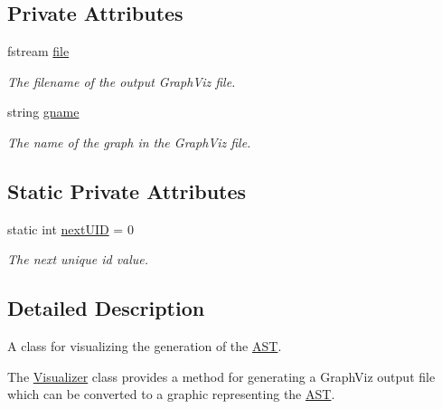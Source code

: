 \subsection*{Private Attributes}
\begin{DoxyCompactItemize}
\item 
\hypertarget{classVisualizer_a19e773638cb9f4665a9bdb44348f584c}{fstream \hyperlink{classVisualizer_a19e773638cb9f4665a9bdb44348f584c}{file}}\label{classVisualizer_a19e773638cb9f4665a9bdb44348f584c}

\begin{DoxyCompactList}\small\item\em The filename of the output Graph\-Viz file. \end{DoxyCompactList}\item 
\hypertarget{classVisualizer_a931ff38910382c55271e07617aac0422}{string \hyperlink{classVisualizer_a931ff38910382c55271e07617aac0422}{gname}}\label{classVisualizer_a931ff38910382c55271e07617aac0422}

\begin{DoxyCompactList}\small\item\em The name of the graph in the Graph\-Viz file. \end{DoxyCompactList}\end{DoxyCompactItemize}
\subsection*{Static Private Attributes}
\begin{DoxyCompactItemize}
\item 
\hypertarget{classVisualizer_adee8de8f3890a06ae60f88b85ac98bc1}{static int \hyperlink{classVisualizer_adee8de8f3890a06ae60f88b85ac98bc1}{next\-U\-I\-D} = 0}\label{classVisualizer_adee8de8f3890a06ae60f88b85ac98bc1}

\begin{DoxyCompactList}\small\item\em The next unique id value. \end{DoxyCompactList}\end{DoxyCompactItemize}


\subsection{Detailed Description}
A class for visualizing the generation of the \hyperlink{classAST}{A\-S\-T}. 

The \hyperlink{classVisualizer}{Visualizer} class provides a method for generating a Graph\-Viz output file which can be converted to a graphic representing the \hyperlink{classAST}{A\-S\-T}. 

